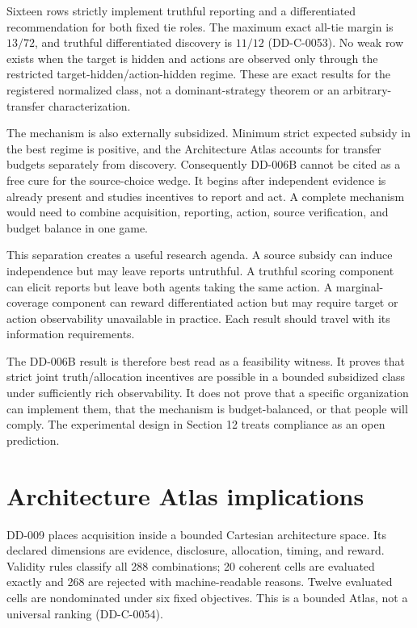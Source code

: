 \documentclass[11pt]{article}
\begin{document}
Sixteen rows strictly implement truthful reporting and a differentiated
recommendation for both fixed tie roles. The maximum exact all-tie margin is
$13/72$, and truthful differentiated discovery is $11/12$ (DD-C-0053). No weak
row exists when the target is hidden and actions are observed only through the
restricted target-hidden/action-hidden regime. These are exact results for the
registered normalized class, not a dominant-strategy theorem or an
arbitrary-transfer characterization.

The mechanism is also externally subsidized. Minimum strict expected subsidy in
the best regime is positive, and the Architecture Atlas accounts for transfer
budgets separately from discovery. Consequently DD-006B cannot be cited as a
free cure for the source-choice wedge. It begins after independent evidence is
already present and studies incentives to report and act. A complete mechanism
would need to combine acquisition, reporting, action, source verification, and
budget balance in one game.

This separation creates a useful research agenda. A source subsidy can induce
independence but may leave reports untruthful. A truthful scoring component can
elicit reports but leave both agents taking the same action. A marginal-coverage
component can reward differentiated action but may require target or action
observability unavailable in practice. Each result should travel with its
information requirements.

The DD-006B result is therefore best read as a feasibility witness. It proves
that strict joint truth/allocation incentives are possible in a bounded
subsidized class under sufficiently rich observability. It does not prove that a
specific organization can implement them, that the mechanism is budget-balanced,
or that people will comply. The experimental design in Section 12 treats
compliance as an open prediction.

\section{Architecture Atlas implications}

DD-009 places acquisition inside a bounded Cartesian architecture space. Its
declared dimensions are evidence, disclosure, allocation, timing, and reward.
Validity rules classify all 288 combinations; 20 coherent cells are evaluated
exactly and 268 are rejected with machine-readable reasons. Twelve evaluated
cells are nondominated under six fixed objectives. This is a bounded Atlas, not
a universal ranking (DD-C-0054).
\end{document}
